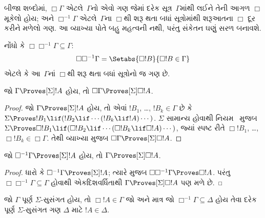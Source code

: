 બીજા શબ્દોમાં, $\Box\Gamma$ એટલે~$\Gamma$નો એવો ગણ જેમાં
દરેક સૂત્ર~$\Gamma$માંથી લઈને તેની આગળ $\Box$ મૂકેલો હોય;
અને $\Box^{-1}\Gamma$ એટલે~$\Gamma$ના
$\Box$થી શરૂ થતા બધાં સૂત્રોમાંથી શરૂઆતના $\Box$ દૂર કરીને
મળેલો ગણ. આ વ્યાખ્યા પોતે બહુ મહત્વની નથી, પરંતુ સંકેતન ઘણું સરળ
બનાવશે.

નોંધો કે $\Box\Box^{-1}\Gamma \subseteq \Gamma$:
\[
\Box\Box^{-1}\Gamma = \Setabs{\Box!B}{\Box!B \in \Gamma}
\]
એટલે કે આ~$\Gamma$નાં $\Box$થી શરૂ થતા બધાં સૂત્રોનો જ ગણ છે.

\begin{lem}
  જો $\Gamma \Proves[\Sigma] !A$ હોય, તો $\Box\Gamma
  \Proves[\Sigma] \Box !A$.
\end{lem}

\begin{proof}
  જો $\Gamma \Proves[\Sigma] !A$ હોય, તો એવાં $!B_1$, \dots,
  $!B_k \in \Gamma$ છે કે $\Sigma \Proves !B_1 \lif (!B_2 \lif
  \cdots (!B_k \lif !A)\cdots)$. $\Sigma$ સામાન્ય હોવાથી
  નિયમ~\RK{} મુજબ $\Sigma \Proves \Box!B_1 \lif (\Box!B_2 \lif
  \cdots (\Box!B_k \lif \Box!A)\cdots)$, જ્યાં સ્પષ્ટ રીતે
  $\Box!B_1$, \dots, $\Box!B_k \in \Box\Gamma$. તેથી વ્યાખ્યા મુજબ
  $\Box\Gamma \Proves[\Sigma] \Box !A$.
\end{proof}

\begin{lem}
  જો $\Box^{-1} \Gamma \Proves[\Sigma] !A$ હોય, તો $\Gamma
  \Proves[\Sigma] \Box!A$.
\end{lem}

\begin{proof}
  ધારો કે $\Box^{-1}\Gamma \Proves[\Sigma] !A$; ત્યારે
   મુજબ $\Box\Box^{-1}\Gamma \Proves \Box!A$.
  પરંતુ $\Box\Box^{-1}\Gamma \subseteq \Gamma$ હોવાથી
  એકદિશવર્ધિતાથી $\Gamma \Proves[\Sigma] \Box!A$ પણ મળે છે.
\end{proof}

%

\begin{prop}
  જો $\Gamma$ પૂર્ણ $\Sigma$-સુસંગત હોય, તો $\Box !A \in
  \Gamma$ જો અને માત્ર જો $\Box^{-1} \Gamma \subseteq \Delta$
  હોય તેવા દરેક પૂર્ણ $\Sigma$-સુસંગત ગણ $\Delta$ માટે
  $!A \in \Delta$.
\end{prop}

